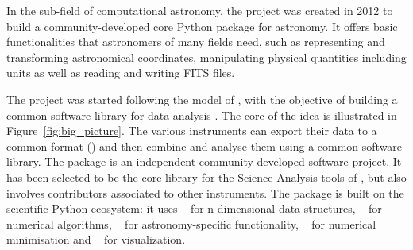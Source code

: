 \documentclass[longauth]{aa}
\begin{document}
In the sub-field of computational astronomy, the \astropy project \citep{astropy} was created in 2012
to build a community-developed core Python package for astronomy.
It offers basic functionalities that astronomers of many fields need, such as representing
and transforming astronomical coordinates, manipulating physical quantities including units
as well as reading and writing FITS files.


The \gammapy project was started following the model of \astropy, with the objective of building a common
software library for \gammaray data analysis \citep{gammapy_2015}. 
The core of the idea is illustrated in Figure~\ref{fig:big_picture}. The various \gammaray instruments
can export their data to a common format (\gadf) and then combine and analyse
them using a common software library.
The \gammapy package is an independent community-developed software project.
It has been selected to be the core library for the Science Analysis tools of \cta,
but also involves contributors associated to other instruments.
The \gammapy package is built on the scientific Python ecosystem: it uses \numpy~\citep{numpy} for n-dimensional data
structures, \scipy~\citep{2020SciPy-NMeth} for numerical algorithms, \astropy~\citep{astropy} for
astronomy-specific functionality, \iminuit~\citep{iminuit} for numerical minimisation
and \matplotlib~\citep{matplotlib} for visualization.

\end{document}
